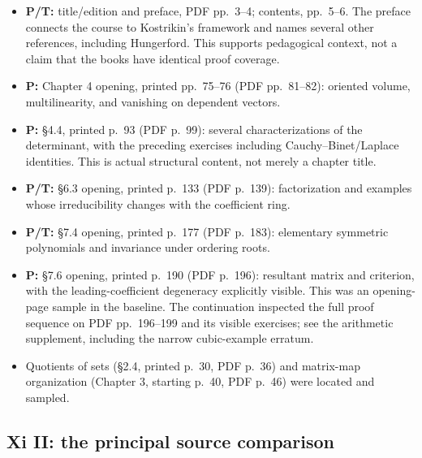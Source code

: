 \documentclass[
  11pt,
]{article}
\providecommand{\tightlist}{%
  \setlength{\itemsep}{0pt}\setlength{\parskip}{0pt}}
\begin{document}
\begin{itemize}
\tightlist
\item
  \textbf{P/T:} title/edition and preface, PDF pp.~3--4; contents,
  pp.~5--6. The preface connects the course to Kostrikin's framework and
  names several other references, including Hungerford. This supports
  pedagogical context, not a claim that the books have identical proof
  coverage.
\item
  \textbf{P:} Chapter 4 opening, printed pp.~75--76 (PDF pp.~81--82):
  oriented volume, multilinearity, and vanishing on dependent vectors.
\item
  \textbf{P:} §4.4, printed p.~93 (PDF p.~99): several characterizations
  of the determinant, with the preceding exercises including
  Cauchy--Binet/Laplace identities. This is actual structural content,
  not merely a chapter title.
\item
  \textbf{P/T:} §6.3 opening, printed p.~133 (PDF p.~139): factorization
  and examples whose irreducibility changes with the coefficient ring.
\item
  \textbf{P/T:} §7.4 opening, printed p.~177 (PDF p.~183): elementary
  symmetric polynomials and invariance under ordering roots.
\item
  \textbf{P:} §7.6 opening, printed p.~190 (PDF p.~196): resultant
  matrix and criterion, with the leading-coefficient degeneracy
  explicitly visible. This was an opening-page sample in the baseline.
  The continuation inspected the full proof sequence on PDF pp.~196--199
  and its visible exercises; see the arithmetic supplement, including
  the narrow cubic-example erratum.
\item
  Quotients of sets (§2.4, printed p.~30, PDF p.~36) and matrix-map
  organization (Chapter 3, starting p.~40, PDF p.~46) were located and
  sampled.
\end{itemize}

\subsection{Xi II: the principal source
comparison}\label{xi-ii-the-principal-source-comparison}
\end{document}
